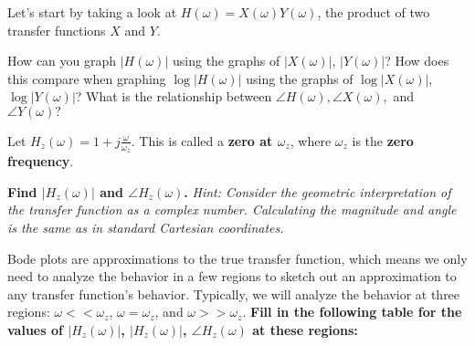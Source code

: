 \begin{enumerate}

\qitem Let's start by taking a look at $H(\omega) = X(\omega)Y(\omega)$, the product of two transfer functions $X$ and $Y$.
\begin{enumerate}
    \qitem How can you graph $|H(\omega)|$ using the graphs of $|X(\omega)|$, $|Y(\omega)|$?
    \qitem How does this compare when graphing $\log |H(\omega)|$ using the graphs of $\log |X(\omega)|$, $\log |Y(\omega)|$?
    \qitem What is the relationship between $\angle H(\omega), \angle X(\omega),$ and $\angle Y(\omega)?$
\end{enumerate}


\qitem Let $H_z(\omega) = 1 + j \frac{\omega}{\omega_z}$. This is called a \textbf{zero at $\omega_z$}, where $\omega_z$ is the \textbf{zero frequency}.
\begin{enumerate}
    \qitem \textbf{Find $|H_z(\omega)|$ and $\angle H_z(\omega)$.}
           \textit{Hint: Consider the geometric interpretation of the transfer function as a complex number.
           Calculating the magnitude and angle is the same as in standard Cartesian coordinates.}


    \qitem Bode plots are approximations to the true transfer function, which means we only need to analyze the behavior in a few regions to sketch out an approximation to any transfer function's behavior.
    Typically, we will analyze the behavior at three regions: $\omega << \omega_z$, $\omega = \omega_z$, and $\omega >> \omega_z$.
    \textbf{Fill in the following table for the values of $|H_z(\omega)|$, $|H_z(\omega)|$, $\angle H_z(\omega)$ at these regions:}


\end{enumerate}
\end{enumerate}
